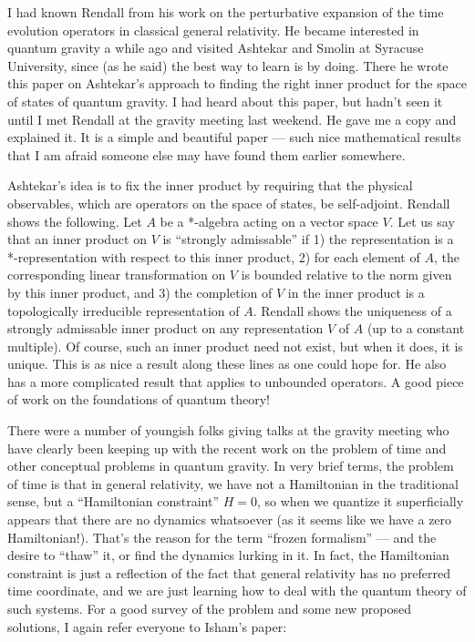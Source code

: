 \documentclass{article}
\def\tightlist{}
\renewcommand{\texttt}[1]{%
  \begingroup
  \ttfamily
  \begingroup\lccode`~=`/\lowercase{\endgroup\def~}{/\discretionary{}{}{}}%
  \begingroup\lccode`~=`[\lowercase{\endgroup\def~}{[\discretionary{}{}{}}%
  \begingroup\lccode`~=`.\lowercase{\endgroup\def~}{.\discretionary{}{}{}}%
  \catcode`/=\active\catcode`[=\active\catcode`.=\active
  \scantokens{#1\noexpand}%
  \endgroup
}
\begin{document}
I had known Rendall from his work on the perturbative expansion of the
time evolution operators in classical general relativity. He became
interested in quantum gravity a while ago and visited Ashtekar and
Smolin at Syracuse University, since (as he said) the best way to learn
is by doing. There he wrote this paper on Ashtekar's approach to finding
the right inner product for the space of states of quantum gravity. I
had heard about this paper, but hadn't seen it until I met Rendall at
the gravity meeting last weekend. He gave me a copy and explained it. It
is a simple and beautiful paper --- such nice mathematical results that
I am afraid someone else may have found them earlier somewhere.

Ashtekar's idea is to fix the inner product by requiring that the
physical observables, which are operators on the space of states, be
self-adjoint. Rendall shows the following. Let \(A\) be a *-algebra
acting on a vector space \(V\). Let us say that an inner product on
\(V\) is ``strongly admissable'' if 1) the representation is a
*-representation with respect to this inner product, 2) for each element
of \(A\), the corresponding linear transformation on \(V\) is bounded
relative to the norm given by this inner product, and 3) the completion
of \(V\) in the inner product is a topologically irreducible
representation of \(A\). Rendall shows the uniqueness of a strongly
admissable inner product on any representation \(V\) of \(A\) (up to a
constant multiple). Of course, such an inner product need not exist, but
when it does, it is unique. This is as nice a result along these lines
as one could hope for. He also has a more complicated result that
applies to unbounded operators. A good piece of work on the foundations
of quantum theory!


There were a number of youngish folks giving talks at the gravity
meeting who have clearly been keeping up with the recent work on the
problem of time and other conceptual problems in quantum gravity. In
very brief terms, the problem of time is that in general relativity, we
have not a Hamiltonian in the traditional sense, but a ``Hamiltonian
constraint'' \(H = 0\), so when we quantize it superficially appears
that there are no dynamics whatsoever (as it seems like we have a zero
Hamiltonian!). That's the reason for the term ``frozen formalism'' ---
and the desire to ``thaw'' it, or find the dynamics lurking in it. In
fact, the Hamiltonian constraint is just a reflection of the fact that
general relativity has no preferred time coordinate, and we are just
learning how to deal with the quantum theory of such systems. For a good
survey of the problem and some new proposed solutions, I again refer
everyone to Isham's paper:
\end{document}
